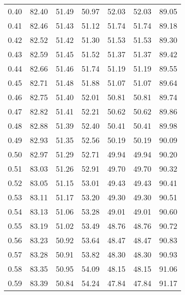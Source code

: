 \begin{tabular}{|c|c|c|c|c|c|c|}
      0.40 &     82.40 &     51.49 &      50.97 &   52.03 &      52.03 &         89.05 \\
      0.41 &     82.46 &     51.43 &      51.12 &   51.74 &      51.74 &         89.18 \\
      0.42 &     82.52 &     51.42 &      51.30 &   51.53 &      51.53 &         89.30 \\
      0.43 &     82.59 &     51.45 &      51.52 &   51.37 &      51.37 &         89.42 \\
      0.44 &     82.66 &     51.46 &      51.74 &   51.19 &      51.19 &         89.55 \\
      0.45 &     82.71 &     51.48 &      51.88 &   51.07 &      51.07 &         89.64 \\
      0.46 &     82.75 &     51.40 &      52.01 &   50.81 &      50.81 &         89.74 \\
      0.47 &     82.82 &     51.41 &      52.21 &   50.62 &      50.62 &         89.86 \\
      0.48 &     82.88 &     51.39 &      52.40 &   50.41 &      50.41 &         89.98 \\
      0.49 &     82.93 &     51.35 &      52.56 &   50.19 &      50.19 &         90.09 \\
      0.50 &     82.97 &     51.29 &      52.71 &   49.94 &      49.94 &         90.20 \\
      0.51 &     83.03 &     51.26 &      52.91 &   49.70 &      49.70 &         90.32 \\
      0.52 &     83.05 &     51.15 &      53.01 &   49.43 &      49.43 &         90.41 \\
      0.53 &     83.11 &     51.17 &      53.20 &   49.30 &      49.30 &         90.51 \\
      0.54 &     83.13 &     51.06 &      53.28 &   49.01 &      49.01 &         90.60 \\
      0.55 &     83.19 &     51.02 &      53.49 &   48.76 &      48.76 &         90.72 \\
      0.56 &     83.23 &     50.92 &      53.64 &   48.47 &      48.47 &         90.83 \\
      0.57 &     83.28 &     50.91 &      53.82 &   48.30 &      48.30 &         90.93 \\
      0.58 &     83.35 &     50.95 &      54.09 &   48.15 &      48.15 &         91.06 \\
      0.59 &     83.39 &     50.84 &      54.24 &   47.84 &      47.84 &         91.17 \\

\end{tabular}
